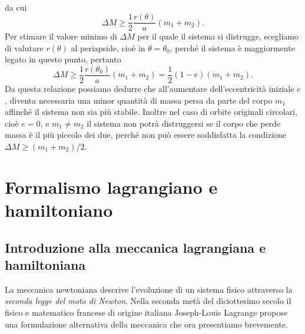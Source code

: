 {\begin{equation}
\begin{split}
  \end{split}
\end{equation}
da cui
\begin{equation}
  \Delta M \geq \frac{1}{2}\frac{r(\theta)}{a}(m_1 + m_2).
\end{equation}
Per stimare il valore minimo di $\Delta M$ per il quale il sistema si distrugge,
scegliamo di valutare $r(\theta)$ al periapside, cioè in $\theta = \theta_0$,
perché il sistema è maggiormente legato in questo punto, pertanto
\begin{equation}
    \Delta M \geq \frac{1}{2}\frac{r(\theta_0)}{a}(m_1 + m_2) =
    \frac{1}{2}(1 - e)(m_1 + m_2).
\end{equation}
Da questa relazione possiamo dedurre che all'aumentare dell'eccentricità
iniziale $e$, diventa necessaria una minor quantità di massa persa da parte del
corpo $m_1$ affinché il sistema non sia più stabile. Inoltre nel caso di orbite
originali circolari, cioè $e=0$, e $m_1 \neq m_2$ il sistema non potrà
distruggersi se il corpo che perde massa è il più piccolo dei due, perché non
può essere soddisfatta la condizione $\Delta M \geq (m_1 + m_2)/2$.

\section{Formalismo lagrangiano e hamiltoniano}
\label{sec:formalismo-lagrange}

\subsection{Introduzione alla meccanica lagrangiana e hamiltoniana}
\label{sec:intro-lagrange}

La meccanica newtoniana descrive l'evoluzione di un sistema fisico attraverso la
\emph{seconda legge del moto di Newton}. Nella seconda metà del diciottesimo
secolo il fisico e matematico francese di origine italiana Joseph-Louis Lagrange
propose una formulazione alternativa della meccanica che ora presentiamo
brevemente.

}
